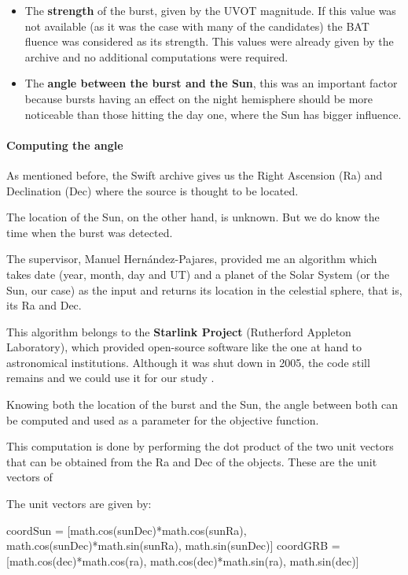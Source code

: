 \documentclass[12pt]{article}
\begin{document}
\begin{itemize}

\item The \textbf{strength} of the burst, given by the UVOT magnitude. If this value was not available (as it was the case with many of the candidates) the BAT fluence was considered as its strength. This values were already given by the archive and no additional computations were required.

\item The \textbf{angle between the burst and the Sun}, this was an important factor because bursts having an effect on the night hemisphere should be more noticeable than those hitting the day one, where the Sun has bigger influence.

\end{itemize}

\paragraph{Computing the angle}

As mentioned before, the Swift archive gives us the Right Ascension (Ra) and Declination (Dec) where the source is thought to be located.

The location of the Sun, on the other hand, is unknown. But we do know the time when the burst was detected.

The supervisor, Manuel Hernández-Pajares, provided me an algorithm which takes date (year, month, day and UT) and a planet of the Solar System (or the Sun, our case) as the input and returns its location in the celestial sphere, that is, its Ra and Dec. 

This algorithm belongs to the \textbf{Starlink Project} (Rutherford Appleton Laboratory), which provided open-source software like the one at hand to astronomical institutions. Although it was shut down in 2005, the code still remains and we could use it for our study \cite{starlinkproject}.

Knowing both the location of the burst and the Sun, the angle between both can be computed and used as a parameter for the objective function.

This computation is done by performing the dot product of the two unit vectors that can be obtained from the Ra and Dec of the objects. These are the unit vectors of

The unit vectors are given by: 

	coordSun = [math.cos(sunDec)*math.cos(sunRa), math.cos(sunDec)*math.sin(sunRa), math.sin(sunDec)]
coordGRB = [math.cos(dec)*math.cos(ra), math.cos(dec)*math.sin(ra), math.sin(dec)]
\end{document}
